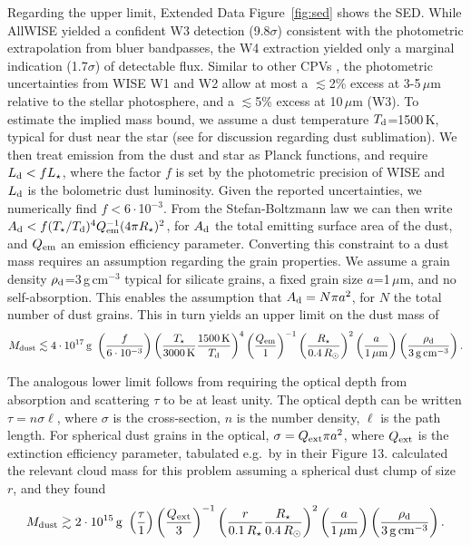 \documentclass{nature3}
\begin{document}
\begin{methods}
Regarding the upper limit, Extended Data Figure~\ref{fig:sed} shows the SED.  While
AllWISE \cite{Cutri2014} yielded a confident W3 detection
(9.8$\sigma$) consistent with the photometric extrapolation from bluer
bandpasses, the W4 extraction yielded only a marginal indication
(1.7$\sigma$) of detectable flux.  Similar to other CPVs
\cite{Stauffer2017,Bouma2024}, the photometric uncertainties from WISE
W1 and W2 allow at most a $\lesssim$2\% excess at 3-5\,$\mu$m relative
to the stellar photosphere, and a $\lesssim$5\% excess at 10\,$\mu$m
(W3).  To estimate the implied mass bound, we assume a dust
temperature $T_{\rm d}$=1500\,K, typical for dust near the star (see
\cite{Zhan2019} for discussion regarding dust sublimation).  We then
treat emission from the dust and star as Planck functions, and require
$L_{\rm d} < f L_\star$, where the factor $f$ is set by the
photometric precision of WISE and $L_{\rm d}$ is the bolometric dust
luminosity.  Given the reported uncertainties, we numerically find
$f<6\cdot$10$^{-3}$.  From the Stefan-Boltzmann law we can then write
$A_{\rm d} < f (T_\star / T_{\rm d})^4 Q_{\rm em}^{-1} (4\pi
R_\star)^2$, for $A_{\rm d}$ the total emitting surface area of the
dust, and $Q_{\rm em}$ an emission efficiency parameter.  Converting
this constraint to a dust mass requires an assumption regarding the
grain properties.  We assume a grain density $\rho_{\rm
d}$=3\,g\,cm$^{-3}$ typical for silicate grains, a fixed grain size
$a$=1\,$\mu$m, and no self-absorption.  This enables the assumption
that $A_{\rm d} = N \pi a^2$, for $N$ the total number of dust grains.
This in turn yields an upper limit on the dust mass of
\begin{equation}
  M_{\rm dust} \lesssim 4 \cdot 10^{17}\, {\rm g}\ 
  \left( \frac{f}{6\cdot10^{-3}} \right)
  \left( \frac{T_\star}{3000\,{\rm K}} \frac{1500\,{\rm K}}{T_{\rm d}} \right)^4
  \left( \frac{Q_{\rm em}}{1} \right)^{-1}
  \left( \frac{R_\star}{0.4\,R_\odot} \right)^2
  \left( \frac{a}{1\,\mathrm{\mu m}} \right)
  \left( \frac{\rho_{\rm d}}{3\,\mathrm{g\,cm^{-3}}} \right).
\end{equation}

The analogous lower limit follows from requiring the optical depth
from absorption and scattering $\tau$ to be at least unity.  The
optical depth can be written $\tau = n \sigma \ell$, where
$\sigma$ is the cross-section, $n$ is the number density, $\ell$ is
the path length.  For spherical dust
grains in the optical, $\sigma = Q_{\rm ext} \pi a^2$, where $Q_{\rm
ext}$ is the extinction efficiency parameter, tabulated e.g.~by
\cite{Croll2014} in their Figure 13.  \cite{Sanderson2023} calculated
the relevant cloud mass for this problem assuming a spherical dust
clump of size $r$, and they found
\begin{equation}
  M_{\rm dust} \gtrsim 2 \cdot 10^{15}\, {\rm g}\ 
  \left( \frac{\tau}{1} \right)
  \left( \frac{Q_{\rm ext}}{3} \right)^{-1}
  \left( \frac{r}{0.1\,R_\star} \frac{R_\star}{0.4\,R_\odot} \right)^2
  \left( \frac{a}{1\,\mathrm{\mu m}} \right)
  \left( \frac{\rho_{\rm d}}{3\,\mathrm{g\,cm^{-3}}} \right).
\end{equation}


\end{methods}
\end{document}

